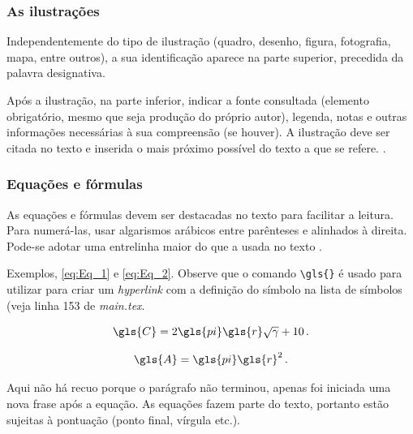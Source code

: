 \subsubsection{As ilustrações}

Independentemente do tipo de ilustração (quadro, desenho, figura, fotografia, mapa, entre outros), a sua identificação aparece na parte superior, precedida da palavra designativa. 

\begin{citacao}
	Após a ilustração, na parte inferior, indicar a fonte consultada (elemento obrigatório, mesmo que seja produção do próprio autor), legenda, notas e outras informações necessárias à sua compreensão (se houver). A ilustração deve ser citada no texto e inserida o mais próximo possível do texto a que se refere. \cite[p. 11]{NBR14724:2011}.
\end{citacao}

\subsubsection{Equações e fórmulas}

As equações e fórmulas devem ser destacadas no texto para facilitar a leitura.  Para numerá-las, usar algarismos arábicos entre parênteses e alinhados à direita. Pode-se adotar uma entrelinha maior do que a usada no texto \cite{NBR14724:2011}.

Exemplos, \autoref{eq:Eq_1} e \autoref{eq:Eq_2}. Observe que o comando \verb|\gls{}| é usado para utilizar para criar um \emph{hyperlink} com a definição do símbolo na lista de símbolos (veja linha 153 de \emph{main.tex}.

\begin{equation}
\label{eq:Eq_1}
\gls{C} = 2 \gls{pi} \gls{r} \sqrt{\gamma} + 10 \, \text{.}
\end{equation}

\begin{equation}
\label{eq:Eq_2}
\gls{A} = \gls{pi} \gls{r}^2 \, \text{.}
\end{equation}

\noindent Aqui não há recuo porque o parágrafo não terminou, apenas foi iniciada uma nova frase após a equação. As equações fazem parte do texto, portanto estão sujeitas à pontuação (ponto final, vírgula etc.).

